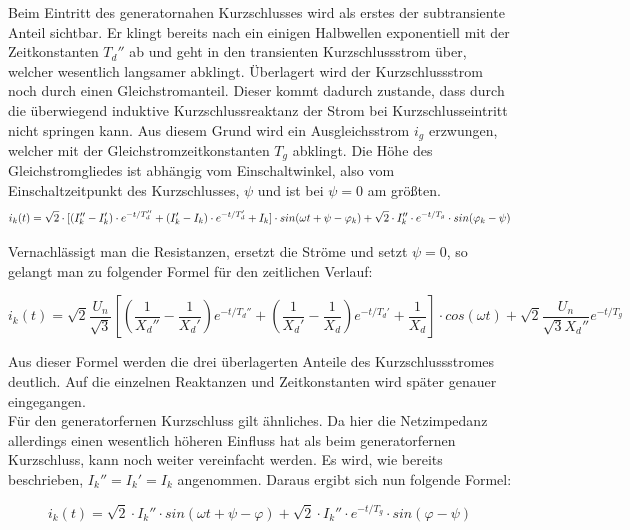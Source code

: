\documentclass{scrartcl}
\begin{document}
\begin{onehalfspace}
Beim Eintritt des generatornahen Kurzschlusses wird als erstes der subtransiente Anteil sichtbar. Er klingt bereits nach ein einigen Halbwellen exponentiell mit der Zeitkonstanten $T_d''$ ab und geht in den transienten Kurzschlussstrom über, welcher wesentlich langsamer abklingt. Überlagert wird der Kurzschlussstrom noch durch einen Gleichstromanteil. Dieser kommt dadurch zustande, dass durch die überwiegend induktive Kurzschlussreaktanz der Strom bei Kurzschlusseintritt nicht \glqq springen\grqq{} kann. Aus diesem Grund wird ein Ausgleichsstrom $i_g$ erzwungen, welcher mit der Gleichstromzeitkonstanten $T_g$ abklingt. Die Höhe des Gleichstromgliedes ist abhängig vom Einschaltwinkel, also vom Einschaltzeitpunkt des Kurzschlusses, $\psi$ und ist bei $\psi = 0$ am größten.
\begin{equation}
i_k(t) = \sqrt{2} \cdot [(I_k'' - I_k') \cdot e^{-t/T_d''} + (I_k' - I_k) \cdot e^{-t/T_d'} + I_k] \cdot sin(\omega t + \psi - \varphi_k) + \sqrt{2} \cdot I_k'' \cdot e^{-t/T_g} \cdot sin( \varphi_k - \psi)  \\
\end{equation}


Vernachlässigt man die Resistanzen, ersetzt die Ströme und setzt $\psi = 0$, so gelangt man zu folgender Formel für den zeitlichen Verlauf:

\begin{equation}
i_k(t) = \sqrt{2} \frac{U_n}{\sqrt{3}} [(\frac{1}{X_d''} - \frac{1}{X_d'}) e^{-t/T_d''} + (\frac{1}{X_d'} - \frac{1}{X_d}) e^{-t/T_d'} + \frac{1}{X_d}] \cdot cos(\omega t) + \sqrt{2} \frac{U_n}{\sqrt{3} X_d''} e^{-t/T_g}
\end{equation}

Aus dieser Formel werden die drei überlagerten Anteile des Kurzschlussstromes deutlich. Auf die einzelnen Reaktanzen und Zeitkonstanten wird später genauer eingegangen. \\

Für den generatorfernen Kurzschluss gilt ähnliches. Da hier die Netzimpedanz allerdings einen wesentlich höheren Einfluss hat als beim generatorfernen Kurzschluss, kann noch weiter vereinfacht werden. Es wird, wie bereits beschrieben, $I_k'' = I_k' = I_k$ angenommen. Daraus ergibt sich nun folgende Formel:

\begin{equation}
i_k(t) = \sqrt{2} \cdot I_k'' \cdot sin(\omega t + \psi - \varphi) + \sqrt{2} \cdot I_k'' \cdot e^{-t/T_g} \cdot sin(\varphi - \psi)
\end{equation}


\end{onehalfspace}
\end{document}
